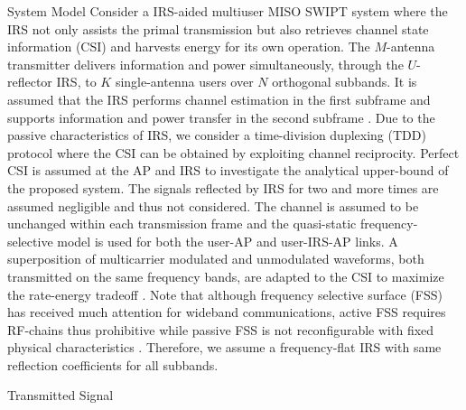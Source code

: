 \documentclass{IEEEtran}
\begin{document}
    \begin{section} {System Model}
        Consider a IRS-aided multiuser MISO SWIPT system where the IRS not only assists the primal transmission but also retrieves channel state information (CSI) and harvests energy for its own operation. The $M$-antenna transmitter delivers information and power simultaneously, through the $U$-reflector IRS, to $K$ single-antenna users over $N$ orthogonal subbands. It is assumed that the IRS performs channel estimation in the first subframe and supports information and power transfer in the second subframe \cite{Zheng2019}. Due to the passive characteristics of IRS, we consider a time-division duplexing (TDD) protocol where the CSI can be obtained by exploiting channel reciprocity. Perfect CSI is assumed at the AP and IRS to investigate the analytical upper-bound of the proposed system. The signals reflected by IRS for two and more times are assumed negligible and thus not considered. The channel is assumed to be unchanged within each transmission frame and the quasi-static frequency-selective model is used for both the user-AP and user-IRS-AP links. A superposition of multicarrier modulated and unmodulated waveforms, both transmitted on the same frequency bands, are adapted to the CSI to maximize the rate-energy tradeoff \cite{Clerckx2018b}. Note that although frequency selective surface (FSS) has received much attention for wideband communications, active FSS requires RF-chains thus prohibitive while passive FSS is not reconfigurable with fixed physical characteristics \cite{Kim2006,Xu2014,Anwar2018}. Therefore, we assume a frequency-flat IRS with same reflection coefficients for all subbands.

        \begin{subsection} {Transmitted Signal}


\end{subsection}
\end{section}
\end{document}
